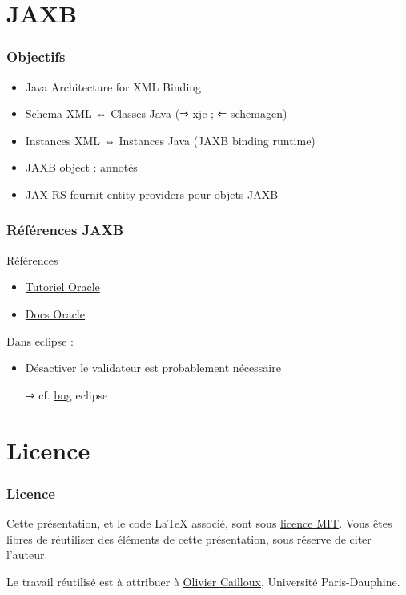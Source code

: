 \documentclass[english, french]{beamer}
\begin{document}
\section{JAXB}
\begin{frame}
	\frametitle{Objectifs}
	\begin{itemize}
		\item Java Architecture for XML Binding
		\item Schema XML ⇔ Classes Java ({}⇒ xjc ; ⇐ schemagen)
		\item Instances XML ⇔ Instances Java (JAXB binding runtime)
		\item JAXB object : annotés
		\item JAX-RS fournit entity providers pour objets JAXB
	\end{itemize}
\end{frame}

\begin{frame}
	\frametitle{Références JAXB}
	\begin{block}{Références}
		\begin{itemize}
			\item \href{https://docs.oracle.com/javase/tutorial/jaxb/index.html}{Tutoriel Oracle}
			\item \href{http://docs.oracle.com/javase/8/docs/technotes/guides/xml/jaxb/}{Docs Oracle}
		\end{itemize}
	\end{block}
	Dans eclipse :
	\begin{itemize}
		\item Désactiver le validateur est probablement nécessaire
		\item[⇒] cf. \href{https://bugs.eclipse.org/bugs/show_bug.cgi?id=437635}{bug} eclipse%
	\end{itemize}
\end{frame}

\appendix

\section{Licence}
\begin{frame}
	\frametitle{Licence}
	Cette présentation, et le code LaTeX associé, sont sous \href{http://opensource.org/licenses/MIT}{licence MIT}. Vous êtes libres de réutiliser des éléments de cette présentation, sous réserve de citer l’auteur.
	
	Le travail réutilisé est à attribuer à \href{http://www.lamsade.dauphine.fr/~ocailloux/}{Olivier Cailloux}, Université Paris-Dauphine.
\end{frame}
\end{document}
